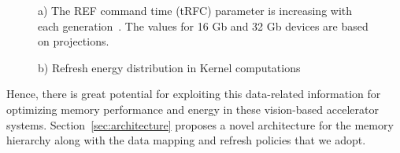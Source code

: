 \begin{figure}[ht!]
\begin{minipage}[b]{1\linewidth}
\centering
{}
\caption{\label{fig:refreshTrends}a) The REF command time (tRFC) parameter is increasing with each generation~\cite{jedec-sdram-standards}. The values for 16 Gb and 32 Gb devices are based on projections.}
\vspace{0.1in}
\end{minipage}
\addtocounter{figure}{-1}
\begin{minipage}[b]{1\linewidth}
\centering
{}
\caption{\label{fig:refreshTrends}b) Refresh energy distribution in Kernel computations}
\end{minipage}
\end{figure}

Hence, there is great potential for exploiting this data-related information for optimizing memory performance and energy in these vision-based accelerator systems. Section~\ref{sec:architecture} proposes a novel architecture for the memory hierarchy along with the data mapping and refresh policies that we adopt.

